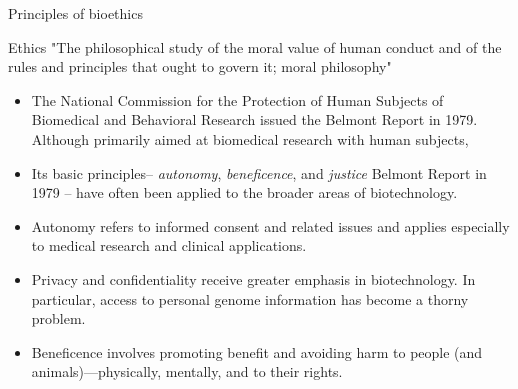 \documentclass[ignorenonframetext,aspectratio=169]{beamer}
\providecommand{\tightlist}{%
  \setlength{\itemsep}{0pt}\setlength{\parskip}{0pt}}
\begin{document}
\begin{frame}{Principles of bioethics}
\protect\hypertarget{principles-of-bioethics}{}

\begin{block}{Ethics}
"The philosophical study of the moral value of human conduct and of the rules and principles that ought to govern it; moral philosophy"
\end{block}

\begin{itemize}
\tightlist
\item
  The National Commission for the Protection of Human Subjects of
  Biomedical and Behavioral Research issued the Belmont Report in 1979.
  Although primarily aimed at biomedical research with human subjects,
\item
  Its basic principles-- \emph{autonomy}, \emph{beneficence}, and
  \emph{justice} Belmont Report in 1979 -- have often been applied to
  the broader areas of biotechnology.
\item
  Autonomy refers to informed consent and related issues and applies
  especially to medical research and clinical applications.
\item
  Privacy and confidentiality receive greater emphasis in biotechnology.
  In particular, access to personal genome information has become a
  thorny problem.
\item
  Beneficence involves promoting benefit and avoiding harm to people
  (and animals)---physically, mentally, and to their rights.
\end{itemize}

\end{frame}
\end{document}

